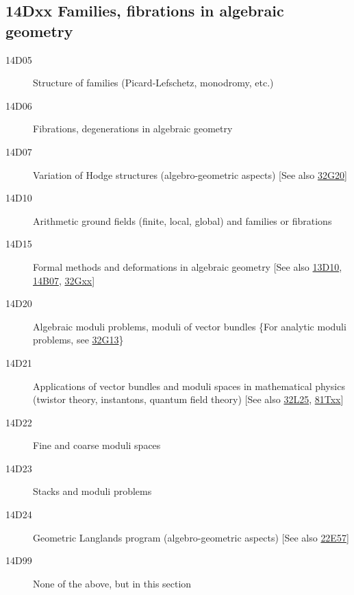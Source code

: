 \subsection*{14Dxx Families, fibrations in algebraic geometry}\label{14Dxx}
\begin{description}
\item [14D05]\label{14D05} Structure of families (Picard-Lefschetz, monodromy, etc.)
\item [14D06]\label{14D06} Fibrations, degenerations in algebraic geometry
\item [14D07]\label{14D07} Variation of Hodge structures (algebro-geometric aspects) [See also \hyperref[32G20]{32G20}]
\item [14D10]\label{14D10} Arithmetic ground fields (finite, local, global) and families or fibrations
\item [14D15]\label{14D15} Formal methods and deformations in algebraic geometry [See also \hyperref[13D10]{13D10}, \hyperref[14B07]{14B07}, \hyperref[32Gxx]{32Gxx}]
\item [14D20]\label{14D20} Algebraic moduli problems, moduli of vector bundles \{For analytic moduli problems, see \hyperref[32G13]{32G13}\}
\item [14D21]\label{14D21} Applications of vector bundles and moduli spaces in mathematical physics (twistor theory, instantons, quantum field theory) [See also \hyperref[32L25]{32L25}, \hyperref[81Txx]{81Txx}]
\item [14D22]\label{14D22} Fine and coarse moduli spaces
\item [14D23]\label{14D23} Stacks and moduli problems
\item [14D24]\label{14D24} Geometric Langlands program (algebro-geometric aspects) [See also \hyperref[22E57]{22E57}]
\item [14D99]\label{14D99} None of the above, but in this section
\end{description}          
